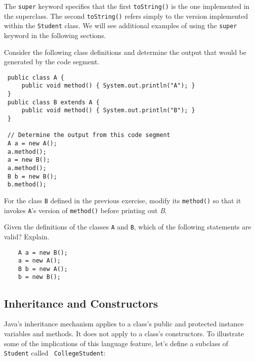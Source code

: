 \noindent The {\tt super} keyword specifies that the first
{\tt toString()} is the one implemented in the superclass.  The second
{\tt toString()} refers simply to the version implemented within the
{\tt Student} class.  We will see additional examples of using the
{\tt super} keyword in the following sections.

\label{self-study-exercises}
\begin{SSTUDY}

\item  Consider the following class definitions and determine the
output that would be generated by the code segment.

\begin{jjjlisting}
\begin{lstlisting}
 public class A {
     public void method() { System.out.println("A"); }
 }
 public class B extends A {
     public void method() { System.out.println("B"); }
 }

 // Determine the output from this code segment
 A a = new A();
 a.method();
 a = new B();
 a.method();
 B b = new B();
 b.method();
\end{lstlisting}
\end{jjjlisting}

\item  For the class {\tt B} defined in the previous exercise,
modify its {\tt method()} so that it invokes {\tt A}'s version
of {\tt method()} before printing out {\em B}.

\item  Given the definitions of the classes {\tt A} and {\tt B},
which of the following statements are valid? Explain.

\begin{jjjlisting}
\begin{lstlisting}
    A a = new B();
    a = new A();
    B b = new A();
    b = new B();
\end{lstlisting}
\end{jjjlisting}


\end{SSTUDY}

\subsection{Inheritance and Constructors}

Java's inheritance mechanism applies to a class's public and protected
instance variables and methods. It does not apply to a class's
constructors. To illustrate some of the implications of this language
feature, let's define a subclass of {\tt Student} called {\tt
CollegeStudent}:


